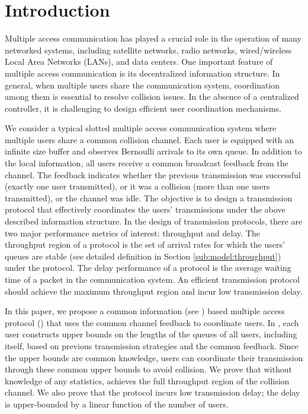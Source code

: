 \documentclass[onecolumn,draftcls]{IEEEtran}
\begin{document}
\IEEEpeerreviewmaketitle



\section{Introduction}

Multiple access communication has played a crucial role in the operation of many networked systems, including satellite networks, radio networks, wired/wireless Local Area Networks (LANs), and data centers.
One important feature of multiple access communication is its decentralized information structure.
In general, when multiple users share the communication system,
coordination among them is essential to resolve collision issues.
In the absence of a centralized controller, it is challenging to design efficient user coordination mechanisms.


We consider a typical slotted multiple access communication system where multiple users share a common collision channel.
Each user is equipped with an infinite size buffer and observes Bernoulli arrivals to its own queue.
In addition to the local information, all users receive a common broadcast feedback from the channel.
The feedback indicates whether the previous transmission was successful (exactly one user transmitted), or it was a collision (more than one users transmitted), or the channel was idle. The objective is to design a transmission protocol that effectively coordinates the users' transmissions under the above described information structure.
In the design of transmission protocols, there are two major performance metrics of interest: throughput and delay.
The throughput region of a protocol is the set of arrival rates for which the users' queues are stable (see detailed definition in Section \ref{sub:model:throughput}) under the protocol. The delay performance of a protocol is the average waiting time of a packet in the communication system. An efficient transmission protocol should achieve the maximum throughput region and incur low transmission delay.


In this paper, we propose a common information (see \cite{nayyar2013decentralized,nayyar2014common}) based multiple access protocol () that uses the common channel feedback to coordinate users. 
In , each user constructs upper bounds on the lengths of the queues of all users, including itself, based on previous transmission strategies and the common feedback.
Since the upper bounds are common knowledge, users can coordinate their transmission through these common upper bounds to avoid collision. 
We prove that without knowledge of any statistics,  achieves the full throughput region of the collision channel.
We also prove that the  protocol incurs low transmission delay; the delay is upper-bounded by a linear function of the number of users.
\end{document}
